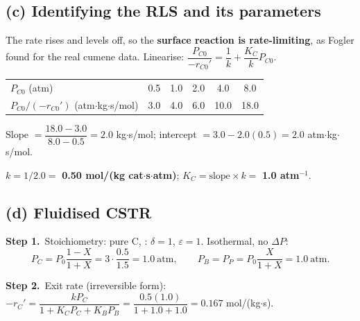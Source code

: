 \documentclass[11pt]{article}
\newcommand{\step}[1]{\par\smallskip\textbf{Step #1.}\ }
\begin{document}
\subsection*{(c) Identifying the RLS and its parameters}
The rate rises and levels off, so the \textbf{surface reaction is rate-limiting}, as Fogler found for the real cumene data.
Linearise: $\dfrac{P_{C0}}{-r_{C0}'}=\dfrac{1}{k}+\dfrac{K_C}{k}P_{C0}$.
\begin{center}
\renewcommand{\arraystretch}{1.25}
\begin{tabular}{lccccc}
\toprule
$P_{C0}$ (atm) & 0.5 & 1.0 & 2.0 & 4.0 & 8.0\\
$P_{C0}/(-r_{C0}')$ (atm$\cdot$kg$\cdot$s/mol) & 3.0 & 4.0 & 6.0 & 10.0 & 18.0\\
\bottomrule
\end{tabular}
\end{center}
Slope $=\dfrac{18.0-3.0}{8.0-0.5}=2.0$ kg$\cdot$s/mol; \quad intercept $=3.0-2.0(0.5)=2.0$ atm$\cdot$kg$\cdot$s/mol.
\begin{answer}
$k=1/2.0=$ \textbf{0.50 mol/(kg cat$\cdot$s$\cdot$atm)}; \quad $K_C=\text{slope}\times k=$ \textbf{1.0 atm$^{-1}$}.
\end{answer}
\begin{center}
\end{center}

\subsection*{(d) Fluidised CSTR}
\step{1}Stoichiometry: pure C, : $\delta=1$, $\varepsilon=1$. Isothermal, no $\Delta P$:
\[
P_C=P_0\frac{1-X}{1+X}=3\cdot\frac{0.5}{1.5}=1.0\ \text{atm},\qquad P_B=P_P=P_0\frac{X}{1+X}=1.0\ \text{atm}.
\]
\step{2}Exit rate (irreversible form):
$-r_C'=\dfrac{kP_C}{1+K_CP_C+K_BP_B}=\dfrac{0.5(1.0)}{1+1.0+1.0}=0.167$ mol/(kg$\cdot$s).
\end{document}
